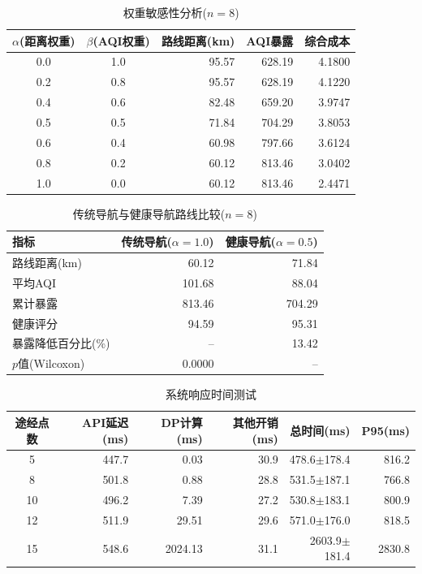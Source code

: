 \begin{table}[htbp]
\centering
\caption{权重敏感性分析($n{=}8$)}
\label{tab:sensitivity}
\begin{tabular}{ccrrr}
\hline
$\alpha$(距离权重) & $\beta$(AQI权重) & 路线距离(km) & AQI暴露 & 综合成本 \\
\hline
0.0 & 1.0 & 95.57 & 628.19 & 4.1800 \\
0.2 & 0.8 & 95.57 & 628.19 & 4.1220 \\
0.4 & 0.6 & 82.48 & 659.20 & 3.9747 \\
0.5 & 0.5 & 71.84 & 704.29 & 3.8053 \\
0.6 & 0.4 & 60.98 & 797.66 & 3.6124 \\
0.8 & 0.2 & 60.12 & 813.46 & 3.0402 \\
1.0 & 0.0 & 60.12 & 813.46 & 2.4471 \\
\hline
\end{tabular}
\end{table}

\begin{table}[htbp]
\centering
\caption{传统导航与健康导航路线比较($n{=}8$)}
\label{tab:trad_vs_health}
\begin{tabular}{lrr}
\hline
指标 & 传统导航($\alpha{=}1.0$) & 健康导航($\alpha{=}0.5$) \\
\hline
路线距离(km) & 60.12 & 71.84 \\
平均AQI & 101.68 & 88.04 \\
累计暴露 & 813.46 & 704.29 \\
健康评分 & 94.59 & 95.31 \\
暴露降低百分比(\%) & -- & 13.42 \\
$p$值(Wilcoxon) & 0.0000 & -- \\
\hline
\end{tabular}
\end{table}

\begin{table}[htbp]
\centering
\caption{系统响应时间测试}
\label{tab:latency}
\begin{tabular}{crrrrr}
\hline
途经点数 & API延迟(ms) & DP计算(ms) & 其他开销(ms) & 总时间(ms) & P95(ms) \\
\hline
5 & 447.7 & 0.03 & 30.9 & 478.6$\pm$178.4 & 816.2 \\
8 & 501.8 & 0.88 & 28.8 & 531.5$\pm$187.1 & 766.8 \\
10 & 496.2 & 7.39 & 27.2 & 530.8$\pm$183.1 & 800.9 \\
12 & 511.9 & 29.51 & 29.6 & 571.0$\pm$176.0 & 818.5 \\
15 & 548.6 & 2024.13 & 31.1 & 2603.9$\pm$181.4 & 2830.8 \\
\hline
\end{tabular}
\end{table}

